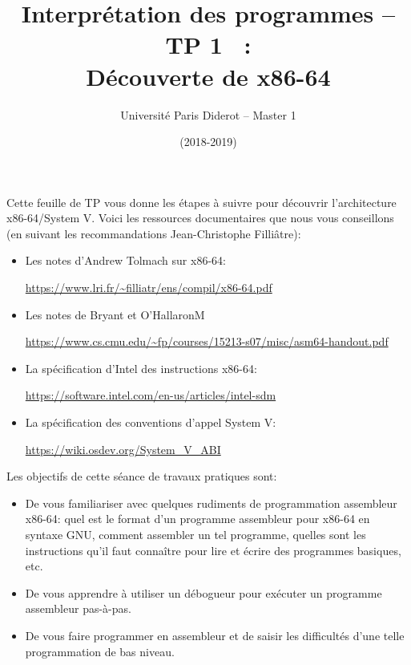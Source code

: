 \documentclass{article}
\title{Interprétation des programmes -- TP 1 ~: \\ Découverte de x86-64}
\author{Université Paris Diderot -- Master 1}
\date{(2018-2019)}
\begin{document}
\maketitle

Cette feuille de TP vous donne les étapes à suivre pour découvrir
l’architecture x86-64/System V. Voici les ressources documentaires que
nous vous conseillons (en suivant les recommandations Jean-Christophe
Filliâtre):

\begin{itemize}
\item Les notes d'Andrew Tolmach sur x86-64:
\begin{flushright}
\url{https://www.lri.fr/~filliatr/ens/compil/x86-64.pdf}
\end{flushright}
\item Les notes de Bryant et O'HallaronM
\begin{flushright}
\url{https://www.cs.cmu.edu/~fp/courses/15213-s07/misc/asm64-handout.pdf}
\end{flushright}
\item La spécification d'Intel des instructions x86-64:
\begin{flushright}
\url{https://software.intel.com/en-us/articles/intel-sdm}
\end{flushright}
\item La spécification des conventions d'appel System V:
\begin{flushright}
\url{https://wiki.osdev.org/System_V_ABI}
\end{flushright}
\end{itemize}

\medskip

Les objectifs de cette séance de travaux pratiques sont:
\begin{itemize}
\item[\faSignIn]
  De vous familiariser avec quelques rudiments de programmation
  assembleur x86-64: quel est le format d'un programme assembleur pour
  x86-64 en syntaxe GNU, comment assembler un tel programme, quelles
  sont les instructions qu'il faut connaître pour lire et écrire des
  programmes basiques, etc.

\item[\faSignIn]
  De vous apprendre à utiliser un débogueur pour exécuter un programme
  assembleur pas-à-pas.

\item[\faSignIn]
  De vous faire programmer en assembleur et de saisir les difficultés
  d'une telle programmation de bas niveau.
\end{itemize}
\end{document}
